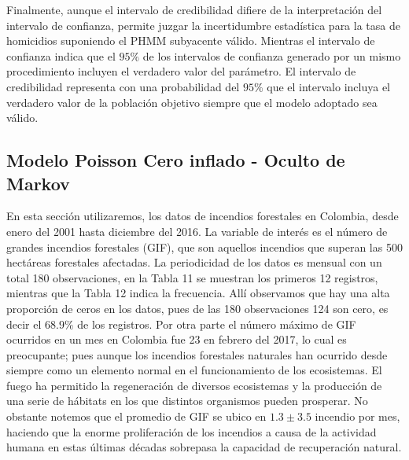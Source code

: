 \documentclass[a4paper]{article}\usepackage[]{graphicx}\usepackage[]{color}
\begin{document}
Finalmente, aunque el intervalo de credibilidad difiere de la interpretación del intervalo de confianza, permite juzgar la incertidumbre estadística para la tasa de homicidios suponiendo el PHMM subyacente válido. Mientras el intervalo de confianza indica que el $95 \%$ de los intervalos de confianza generado por un mismo procedimiento incluyen el verdadero valor del parámetro. El intervalo de credibilidad representa con una probabilidad del $95 \%$ que el intervalo incluya el verdadero valor de la población objetivo siempre que el modelo adoptado sea válido. 

\clearpage

\subsection{Modelo Poisson Cero inflado - Oculto de Markov}



En esta sección utilizaremos, los datos de incendios forestales en Colombia, desde enero del 2001 hasta diciembre del 2016. La variable de interés es el número de grandes incendios forestales (GIF), que son aquellos incendios que superan las 500 hectáreas forestales afectadas. La periodicidad de los datos es mensual con un total 180 observaciones, en la Tabla 11 se muestran los primeros 12 registros, mientras que la Tabla 12 indica la frecuencia. Allí observamos que hay una alta proporción de ceros en los datos, pues de las 180 observaciones 124 son cero, es decir el $68.9 \%$ de los registros. Por otra parte el número máximo de GIF ocurridos en un mes en Colombia fue 23 en febrero del 2017, lo cual es preocupante; pues aunque los incendios forestales naturales han ocurrido desde siempre como un elemento normal en el funcionamiento de los ecosistemas. El fuego ha permitido la regeneración de diversos ecosistemas y la producción de una serie de hábitats en los que distintos organismos pueden prosperar. No obstante notemos que el promedio de GIF se ubico en $1.3 \pm 3.5$ incendio por mes, haciendo que la enorme proliferación de los incendios a causa de la actividad humana en estas últimas décadas sobrepasa la capacidad de recuperación natural.
\end{document}
